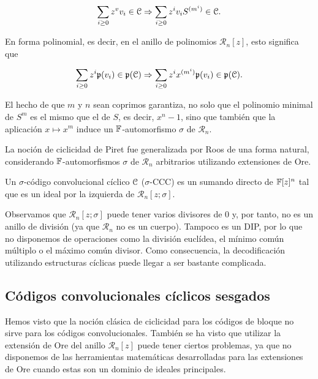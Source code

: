 \begin{equation}
\sum_{i \geq 0} z^v v_i \in \mathcal C \Rightarrow \sum_{i \geq 0}z^iv_iS^{(m^i)} \in \mathcal C .
\end{equation}

En forma polinomial, es decir, en el anillo de polinomios $\mathcal{R}_n[z]$, esto significa que

\begin{equation}
    \sum_{i \geq 0} z^i\mathfrak{p}(v_i) \in \mathfrak{p}(\mathcal C) \Rightarrow \sum_{i \geq 0}z^ix^{(m^i)}\mathfrak{p}(v_i) \in \mathfrak{p}(\mathcal C). 
\end{equation}

El hecho de que $m$ y $n$ sean coprimos garantiza, no solo que el polinomio minimal de $S^m$ es el mismo que el de $S$, es decir, $x^n - 1$, sino que también que la aplicación $x \longmapsto x^m$ induce un $\mathbb{F}$-automorfismo $\sigma$ de $\mathcal{R}_n$.

La noción de ciclicidad de Piret fue generalizada por Roos \cite{Roos} de una forma natural, considerando $\mathbb{F}$-automorfismos $\sigma$ de $\mathcal{R}_n$ arbitrarios utilizando extensiones de Ore.

\begin{definicion}
Un $\sigma$-código convolucional cíclico $\mathcal C$ ($\sigma$-CCC) es un sumando directo de $\mathbb{F}[z]^n$ tal que es un ideal por la izquierda de $\mathcal{R}_n[z;\sigma]$.
\end{definicion}

Observamos que $\mathcal{R}_n[z;\sigma]$ puede tener varios divisores de $0$ y, por tanto, no es un anillo de división (ya que $\mathcal{R}_n$ no es un cuerpo). Tampoco es un DIP, por lo que no disponemos de operaciones como la división euclídea, el mínimo común múltiplo o el máximo común divisor. Como consecuencia, la decodificación utilizando estructuras cíclicas puede llegar a ser bastante complicada.


\subsection{Códigos convolucionales cíclicos sesgados}

Hemos visto que la noción clásica de ciclicidad para los códigos de bloque no sirve para los códigos convolucionales. También se ha visto que utilizar la extensión de Ore del anillo $\mathcal{R}_n[z]$ puede tener ciertos problemas, ya que no disponemos de las herramientas matemáticas desarrolladas para las extensiones de Ore cuando estas son un dominio de ideales principales.

